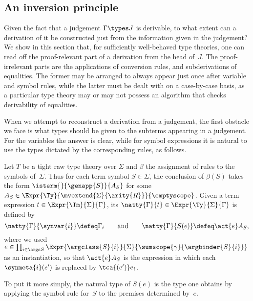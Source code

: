 \subsection{An inversion principle}

Given the fact that a judgement $\Gamma \types J$ is derivable, to what extent can a derivation of it be constructed just from the information given in the judgement? We show in this section that, for sufficiently well-behaved type theories, one can read off the proof-relevant part of a derivation from the head of~$J$. The proof-irrelevant parts are the applications of conversion rules, and subderivations of equalities. The former may be arranged to always appear just once after variable and symbol rules, while the latter must be dealt with on a case-by-case basis, as a particular type theory may or may not possess an algorithm that checks derivability of equalities.

When we attempt to reconstruct a derivation from a judgement, the first obstacle we face is what types should be given to the subterms appearing in a judgement. For the variables the answer is clear, while for symbol expressions it is natural to use the types dictated by the corresponding rules, as follows.

\begin{definition}
  Let $T$ be a tight raw type theory over $\Sigma$ and $\beta$ the assignment of rules to the symbols of~$\Sigma$.
  Thus for each term symbol $S \in \Sigma$, the conclusion of $\beta(S)$ takes the form
  $
    \isterm{}
    {\genapp{S}}{A_S}
  $
  for some $A_S \in \Expr{\Ty}{\mvextend{\Sigma}{\arity{R}}}{\emptyscope}$.
  Given a term expression $t \in \Expr{\Tm}{\Sigma}{\Gamma}$, its  $\natty{\Gamma}{t} \in \Expr{\Ty}{\Sigma}{\Gamma}$ is defined by
  \begin{equation*}
    \natty{\Gamma}{\synvar{i}} \defeq \Gamma_i
    \qquad\text{and}\qquad
    \natty{\Gamma}{S(e)} \defeq \act{e} A_S,
  \end{equation*}
  where we used $e \in \prod_{i \in \args S} \Expr{\argclass{S}{i}}{\Sigma}{\sumscope{\gamma}{\argbinder{S}{i}}}$ as an instantiation, so that $\act{e} A_S$ is the expression in which each $\synmeta{i}(e')$ is replaced by $\tca{(e')} e_i$.
\end{definition}

To put it more simply, the natural type of $S(e)$ is the type one obtains by applying the symbol rule for~$S$ to the premises determined by~$e$.


